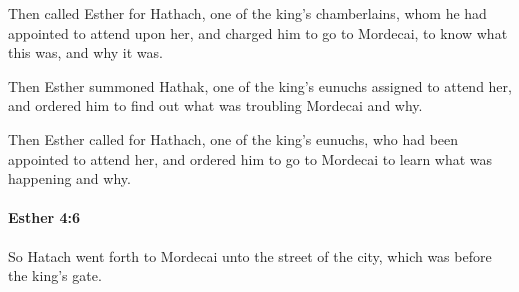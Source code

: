 			\begin{versebox}
					\item[BHS] 
					\item[LXX] 
					\item[ASV] Then called Esther for Hathach, one of the king's chamberlains, whom he had appointed to attend upon her, and charged him to go to Mordecai, to know what this was, and why it was.
					\item[NIV] Then Esther summoned Hathak, one of the king’s eunuchs assigned to attend her, and ordered him to find out what was troubling Mordecai and why.
					\item[NRSV] Then Esther called for Hathach, one of the king’s eunuchs, who had been appointed to attend her, and ordered him to go to Mordecai to learn what was happening and why.
			\end{versebox}

		\paragraph{Esther 4:6} %
			\label{ESTHER-4-6}

			So Hatach went forth to Mordecai unto the street of the city, which was before the king’s gate.

